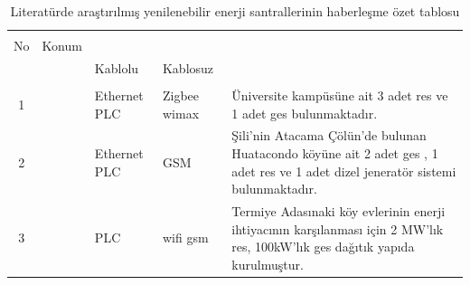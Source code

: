 \begin{table}[htbp]
\centering
\caption{Literatürde araştırılmış yenilenebilir enerji santrallerinin haberleşme özet tablosu}
\label{tab:literatr}

\begin{tabular}{cp{}>{\centering}p{}>{\centering}p{}>{\arraybackslash}p{}}
\hline
\\

No&\multicolumn{1}{c}{Konum}&\multicolumn{2}{c}{Haberleşme Sınıfı}&\multicolumn{1}{c}{Açıklama}\\\cline{3-4}
&&Kablolu&Kablosuz&\\

\\
\hline


1& \cite{BCIT} & Ethernet PLC &Zigbee \gls{wimax} & Üniversite kampüsüne ait 3 adet \gls{res} ve 1 adet \gls{ges} bulunmaktadır.\\
\hline

2& \cite{microgrid_siliOrnek} & Ethernet PLC & GSM & Şili'nin Atacama Çölün'de bulunan Huatacondo köyüne ait 2 adet \gls{ges} , 1 adet \gls{res} ve 1 adet dizel jeneratör sistemi bulunmaktadır.\\
\hline

3& \cite{yunanOrnek} & PLC & \gls{wifi} \gls{gsm} &Termiye Adasınaki köy evlerinin enerji ihtiyacının karşılanması için 2 MW'lık \gls{res}, 100kW'lık \gls{ges} dağıtık yapıda kurulmuştur. \\

\hline


\end{tabular}

\end{table}



